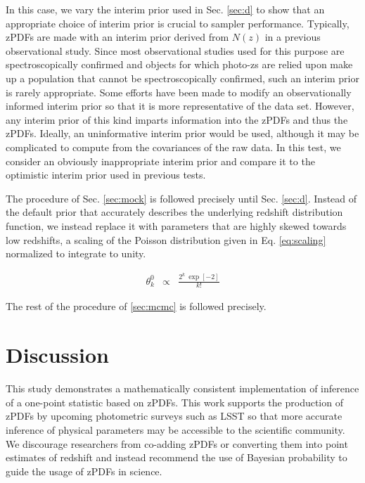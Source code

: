 \documentclass[preprint]{aastex}
\begin{document}
In this case, we vary the interim prior used in Sec. \ref{sec:d} to show that 
an appropriate choice of interim prior is crucial to sampler performance.  
Typically, zPDFs are made with an interim prior derived from $N(z)$ in a 
previous observational study.  Since most observational studies used for this 
purpose are spectroscopically confirmed and objects for which photo-zs are 
relied upon make up a population that cannot be spectroscopically confirmed, 
such an interim prior is rarely appropriate.  Some efforts have been made to 
modify an observationally informed interim prior so that it is more 
representative of the data set.  \citep{she11}  However, any interim prior of 
this kind imparts information into the zPDFs and thus the zPDFs.  Ideally, an 
uninformative interim prior would be used, although it may be complicated to 
compute from the covariances of the raw data.  In this test, we consider an 
obviously inappropriate interim prior and compare it to the optimistic interim 
prior used in previous tests.

The procedure of Sec. \ref{sec:mock} is followed precisely until Sec. 
\ref{sec:d}.  Instead of the default prior that accurately describes the 
underlying redshift distribution function, we instead replace it with 
parameters that are highly skewed towards low redshifts, a scaling of the 
Poisson distribution given in Eq. \ref{eq:scaling} normalized to integrate to 
unity.

\begin{eqnarray}
\label{eq:scaling}
\theta^{0}_{k} &\propto& \frac{2^{k}\ \exp[-2]}{k!}
\end{eqnarray}

The rest of the procedure of \ref{sec:mcmc} is followed precisely.

\clearpage
\section{Discussion}
\label{sec:disc}

This study demonstrates a mathematically consistent implementation of inference 
of a one-point statistic based on zPDFs.  This work supports the production of 
zPDFs by upcoming photometric surveys such as LSST so that more accurate 
inference of physical parameters may be accessible to the scientific community. 
 We discourage researchers from co-adding zPDFs or converting them into point 
estimates of redshift and instead recommend the use of Bayesian probability to 
guide the usage of zPDFs in science.
\end{document}
